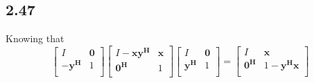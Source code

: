 \documentclass[letterpaper,12pt]{article}
\theoremstyle{definition}
\begin{document}
\subsection*{2.47}
Knowing that
\[
\begin{bmatrix}
    I & \mathbf{0} \\
    -\mathbf{y^H} & 1 \\
\end{bmatrix}
\begin{bmatrix}
    I-\mathbf{xy^H} & \mathbf{x} \\
    \mathbf{0^H} & 1 \\
\end{bmatrix}
\begin{bmatrix}
    I & \mathbf{0} \\
    \mathbf{y^H} & 1 \\
\end{bmatrix}
=
\begin{bmatrix}
    I & \mathbf{x} \\
    \mathbf{0^H} & 1-\mathbf{y^Hx}  \\
\end{bmatrix}
\]
\end{document}
